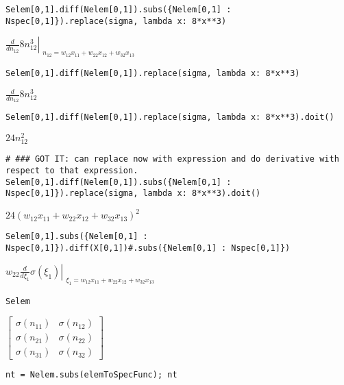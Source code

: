 \documentclass[
]{article}
\begin{document}
\begin{verbatim}
Selem[0,1].diff(Nelem[0,1]).subs({Nelem[0,1] : Nspec[0,1]}).replace(sigma, lambda x: 8*x**3)
\end{verbatim}

\(\displaystyle \left. \frac{d}{d n_{12}} 8 n_{12}^{3} \right|_{\substack{ n_{12}=w_{12} x_{11} + w_{22} x_{12} + w_{32} x_{13} }}\)

\begin{verbatim}
Selem[0,1].diff(Nelem[0,1]).replace(sigma, lambda x: 8*x**3)
\end{verbatim}

\(\displaystyle \frac{d}{d n_{12}} 8 n_{12}^{3}\)

\begin{verbatim}
Selem[0,1].diff(Nelem[0,1]).replace(sigma, lambda x: 8*x**3).doit()
\end{verbatim}

\(\displaystyle 24 n_{12}^{2}\)

\begin{verbatim}
# ### GOT IT: can replace now with expression and do derivative with respect to that expression.
Selem[0,1].diff(Nelem[0,1]).subs({Nelem[0,1] : Nspec[0,1]}).replace(sigma, lambda x: 8*x**3).doit()
\end{verbatim}

\(\displaystyle 24 \left(w_{12} x_{11} + w_{22} x_{12} + w_{32} x_{13}\right)^{2}\)

\begin{verbatim}
Selem[0,1].subs({Nelem[0,1] : Nspec[0,1]}).diff(X[0,1])#.subs({Nelem[0,1] : Nspec[0,1]})
\end{verbatim}

\(\displaystyle w_{22} \left. \frac{d}{d \xi_{1}} \sigma{\left(\xi_{1} \right)} \right|_{\substack{ \xi_{1}=w_{12} x_{11} + w_{22} x_{12} + w_{32} x_{13} }}\)

\begin{verbatim}
Selem
\end{verbatim}

\(\displaystyle \left[\begin{matrix}\sigma{\left(n_{11} \right)} & \sigma{\left(n_{12} \right)}\\\sigma{\left(n_{21} \right)} & \sigma{\left(n_{22} \right)}\\\sigma{\left(n_{31} \right)} & \sigma{\left(n_{32} \right)}\end{matrix}\right]\)

\begin{verbatim}
nt = Nelem.subs(elemToSpecFunc); nt
\end{verbatim}
\end{document}
